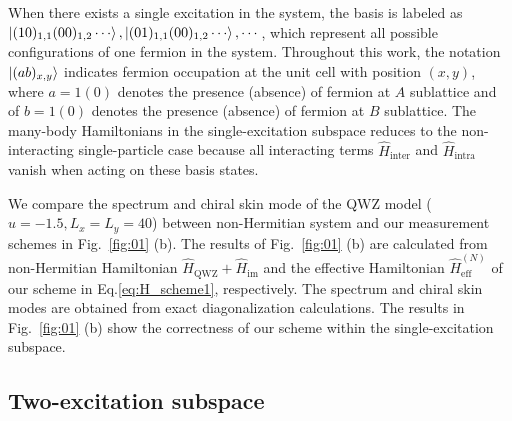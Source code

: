 \documentclass[longbibliography, aps, prx, amsmath, amssymb, amsfonts, twocolumn,superscriptaddress, footinbib]{revtex4-1}
\begin{document}
	When there exists a single excitation in the system, the basis is labeled as $\ket{(10)_{1,1}(00)_{1,2}\cdots}, \ket{(01)_{1,1}(00)_{1,2}\cdots}, \cdots$, which represent all possible configurations of one fermion in the system. 
	Throughout this work, the notation $\ket{(ab)_{x,y}}$ indicates fermion occupation at the unit cell with position $(x,y)$, where $a=1(0)$ denotes the presence (absence) of fermion at $A$ sublattice and  of $b=1(0)$ denotes the presence (absence) of fermion at $B$ sublattice. 
	The many-body Hamiltonians in the single-excitation subspace reduces to the non-interacting single-particle case because all interacting terms $\hat{H}_{\text{inter}}$ and $\hat{H}_{\text{intra}}$ vanish when acting on these basis states. 

	We compare the spectrum and chiral skin mode of the QWZ model ($u=-1.5, L_x=L_y=40$) between non-Hermitian system and our measurement schemes in Fig.~\ref{fig:01} (b). The results of Fig.~\ref{fig:01} (b) are calculated from non-Hermitian Hamiltonian $\hat{H}_{\text{QWZ}} + \hat{H}_{\text{im}}$ and the effective Hamiltonian $\hat{H}_{\text{eff}}^{(N)}$ of our scheme in Eq.\eqref{eq:H_scheme1}, respectively. 
	The spectrum and chiral skin modes are obtained from exact diagonalization calculations. The results in Fig.~\ref{fig:01} (b) show the correctness of our scheme within the single-excitation subspace.



	\subsection{Two-excitation subspace}
\end{document}
